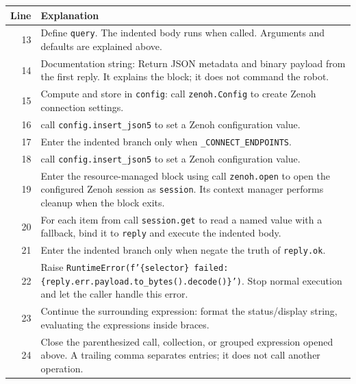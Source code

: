 \documentclass[11pt,a4paper]{book}
\begin{document}
\begin{longtable}{r p{}}

\textbf{Line} & \textbf{Explanation} \\ \hline \endhead

13 & Define \texttt{query}. The indented body runs when called. Arguments and defaults are explained above. \\

14 & Documentation string: Return JSON metadata and binary payload from the first reply. It explains the block; it does not command the robot. \\

15 & Compute and store in \texttt{config}: call \texttt{zenoh.Config} to create Zenoh connection settings.  \\

16 & call \texttt{config.insert\_json5} to set a Zenoh configuration value. \\

17 & Enter the indented branch only when \texttt{\_CONNECT\_ENDPOINTS}. \\

18 & call \texttt{config.insert\_json5} to set a Zenoh configuration value. \\

19 & Enter the resource-managed block using call \texttt{zenoh.open} to open the configured Zenoh session as \texttt{session}. Its context manager performs cleanup when the block exits. \\

20 & For each item from call \texttt{session.get} to read a named value with a fallback, bind it to \texttt{reply} and execute the indented body. \\

21 & Enter the indented branch only when negate the truth of \texttt{reply.ok}. \\

22 & Raise \texttt{RuntimeError(f'\{selector\} failed: \{reply.err.payload.to\_bytes().decode()\}')}. Stop normal execution and let the caller handle this error. \\

23 & Continue the surrounding expression: format the status/display string, evaluating the expressions inside braces. \\

24 & Close the parenthesized call, collection, or grouped expression opened above. A trailing comma separates entries; it does not call another operation. \\


\end{longtable}
\end{document}
